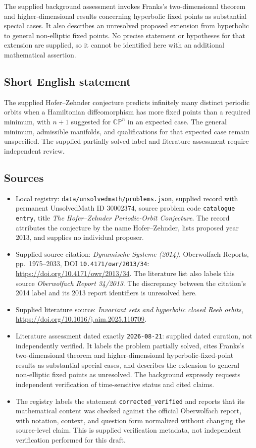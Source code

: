 \documentclass[11pt]{article}
\begin{document}
The supplied background assessment invokes Franks's two-dimensional theorem and higher-dimensional results concerning hyperbolic fixed points as substantial special cases. It also describes an unresolved proposed extension from hyperbolic to general non-elliptic fixed points. No precise statement or hypotheses for that extension are supplied, so it cannot be identified here with an additional mathematical assertion.
\subsection{Short English statement}
The supplied Hofer--Zehnder conjecture predicts infinitely many distinct periodic orbits when a Hamiltonian diffeomorphism has more fixed points than a required minimum, with \(n+1\) suggested for \(\mathbb{CP}^{n}\) in an expected case. The general minimum, admissible manifolds, and qualifications for that expected case remain unspecified. The supplied partially solved label and literature assessment require independent review.
\subsection{Sources}
\begin{itemize}
\item Local registry: \texttt{data/unsolvedmath/problems.json}, supplied record with permanent UnsolvedMath ID \(30002374\), source problem code \texttt{catalogue entry}, title \emph{The Hofer--Zehnder Periodic-Orbit Conjecture}. The record attributes the conjecture by the name Hofer--Zehnder, lists proposed year 2013, and supplies no individual proposer.
\item Supplied source citation: \emph{Dynamische Systeme (2014)}, Oberwolfach Reports, pp.\ 1975--2033, DOI \texttt{10.4171/owr/2013/34}: \url{https://doi.org/10.4171/owr/2013/34}. The literature list also labels this source \emph{Oberwolfach Report 34/2013}. The discrepancy between the citation's 2014 label and its 2013 report identifiers is unresolved here.
\item Supplied literature source: \emph{Invariant sets and hyperbolic closed Reeb orbits}, \url{https://doi.org/10.1016/j.aim.2025.110709}.
\item Literature assessment dated exactly \texttt{2026-08-21}: supplied dated curation, not independently verified. It labels the problem partially solved, cites Franks's two-dimensional theorem and higher-dimensional hyperbolic-fixed-point results as substantial special cases, and describes the extension to general non-elliptic fixed points as unresolved. The background expressly requests independent verification of time-sensitive status and cited claims.
\item The registry labels the statement \texttt{corrected\_verified} and reports that its mathematical content was checked against the official Oberwolfach report, with notation, context, and question form normalized without changing the source-level claim. This is supplied verification metadata, not independent verification performed for this draft.
\end{itemize}
\end{document}
